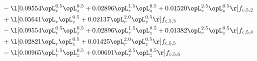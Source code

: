 \begin{alignat}{2}
& - \l[  0.09554 \opL_r^{0.5} \opL_z^{0.5} +  0.02896 \opL_r^{1.5} \opL_z^{0.5} +  0.01520 \opL_r^{2.5} \opL_z^{0.5}  \r] f_{c,5,2} \nonumber \\ 
& + \l[  0.05641 \opL_r \opL_z^{0.5} +  0.02137 \opL_r^{2.0} \opL_z^{0.5}  \r] f_{c,5,3} \nonumber \\ 
& - \l[  0.09554 \opL_r^{0.5} \opL_z^{0.5} +  0.02896 \opL_r^{1.5} \opL_z^{0.5} +  0.01382 \opL_r^{2.5} \opL_z^{0.5}  \r] f_{c,5,4} \nonumber \\ 
& + \l[  0.02821 \opL_r \opL_z^{0.5} +  0.01425 \opL_r^{2.0} \opL_z^{0.5}  \r] f_{c,5,5} \nonumber \\ 
& - \l[  0.00965 \opL_r^{1.5} \opL_z^{0.5} +  0.00691 \opL_r^{2.5} \opL_z^{0.5}  \r] f_{c,5,6} \nonumber \\ 
\end{alignat} 


